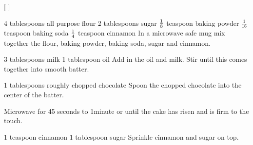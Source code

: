 
[
]

\begin{step}
4 tablespoons all purpose flour
2 tablespoons sugar
$\frac{1}{8}$ teaspoon baking powder
$\frac{1}{16}$ teaspoon baking soda
$\frac{1}{4}$ teaspoon cinnamon
\method
In a microwave safe mug mix together the flour, baking powder, baking soda, sugar and cinnamon.
\end{step}

\begin{step}
3 tablespoons milk
1 tablespoon oil
\method
Add in the oil and milk. Stir until this comes together into smooth batter.
\end{step}

\begin{step}
1 tablespoons roughly chopped chocolate
\method
Spoon the chopped chocolate into the center of the batter.

Microwave for 45 seconds to 1minute or until the cake has risen and is firm to the touch.
\end{step}

\begin{step}
1 teaspoon cinnamon
1 tablespoon sugar
\method
Sprinkle cinnamon and sugar on top.
\end{step}